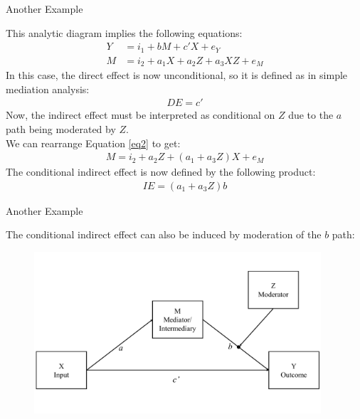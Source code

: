 \documentclass{beamer}
\newcommand{\va}[0]{\vspace{12pt}}
\newcommand{\vb}[0]{\vspace{6pt}}
\begin{document}
\begin{frame}{Another Example}
  
  This analytic diagram implies the following equations:
  \begin{align}
    Y &= i_1 + bM + c'X + e_Y\\
    M &= i_2 + a_1X + a_2Z + a_3XZ + e_M \label{eq2}
  \end{align}
  \pause
  In this case, the direct effect is now unconditional, so it
  is defined as in simple mediation analysis:
  \begin{align*}
    DE = c'
  \end{align*}
  \pause 
  Now, the indirect effect must be interpreted as conditional
  on $Z$ due to the $a$ path being moderated by $Z$.\\ 
  \va 
  \pause 
  We can rearrange Equation \ref{eq2} to get:
  \begin{align*}
    M = i_2 + a_2Z + \left( a_1 + a_3Z \right)X + e_M
  \end{align*}
  The conditional indirect effect is now defined by the following
  product:
  \begin{align*}
    IE = \left(a_1 + a_3Z \right) b
  \end{align*}
  
\end{frame}



\begin{frame}{Another Example}
  
  The conditional indirect effect can also be induced by moderation of
  the $b$ path: 
  \vb
  \begin{figure}
    \includegraphics[width=0.95\textwidth]{figures/modBwithZConceptual.pdf}
  \end{figure}
  
\end{frame}
\end{document}
